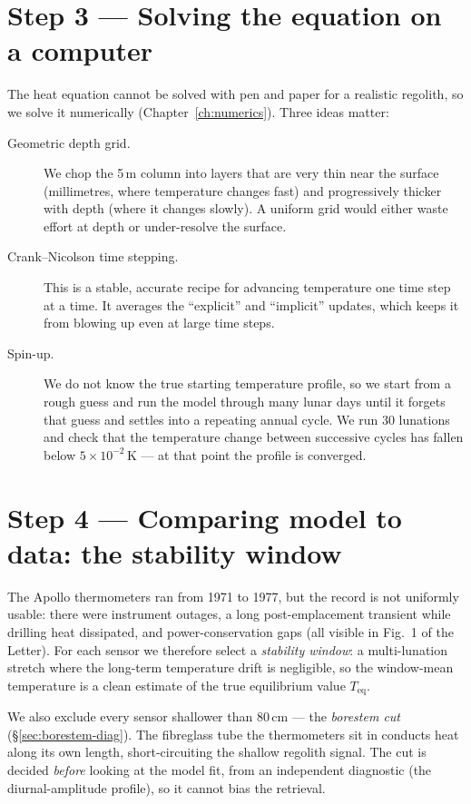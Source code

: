 \documentclass[11pt]{report}
\begin{document}
\section{Step 3 --- Solving the equation on a computer}

The heat equation cannot be solved with pen and paper for a
realistic regolith, so we solve it numerically (Chapter~\ref{ch:numerics}).
Three ideas matter:

\begin{description}
\item[Geometric depth grid.] We chop the 5\,m column into layers
  that are very thin near the surface (millimetres, where
  temperature changes fast) and progressively thicker with depth
  (where it changes slowly). A uniform grid would either waste
  effort at depth or under-resolve the surface.
\item[Crank--Nicolson time stepping.] This is a stable, accurate
  recipe for advancing temperature one time step at a time. It
  averages the ``explicit'' and ``implicit'' updates, which keeps it
  from blowing up even at large time steps.
\item[Spin-up.] We do not know the true starting temperature
  profile, so we start from a rough guess and run the model through
  many lunar days until it forgets that guess and settles into a
  repeating annual cycle. We run 30 lunations and check that the
  temperature change between successive cycles has fallen below
  $5\times10^{-2}$\,K --- at that point the profile is converged.
\end{description}

\section{Step 4 --- Comparing model to data: the stability window}

The Apollo thermometers ran from 1971 to 1977, but the record is
not uniformly usable: there were instrument outages, a long
post-emplacement transient while drilling heat dissipated, and
power-conservation gaps (all visible in Fig.~1 of the Letter). For
each sensor we therefore select a \emph{stability window}: a
multi-lunation stretch where the long-term temperature drift is
negligible, so the window-mean temperature is a clean estimate of
the true equilibrium value $T_\mathrm{eq}$.

We also exclude every sensor shallower than 80\,cm --- the
\emph{borestem cut} (\S\ref{sec:borestem-diag}). The fibreglass
tube the thermometers sit in conducts heat along its own length,
short-circuiting the shallow regolith signal. The cut is decided
\emph{before} looking at the model fit, from an independent
diagnostic (the diurnal-amplitude profile), so it cannot bias the
retrieval.
\end{document}
